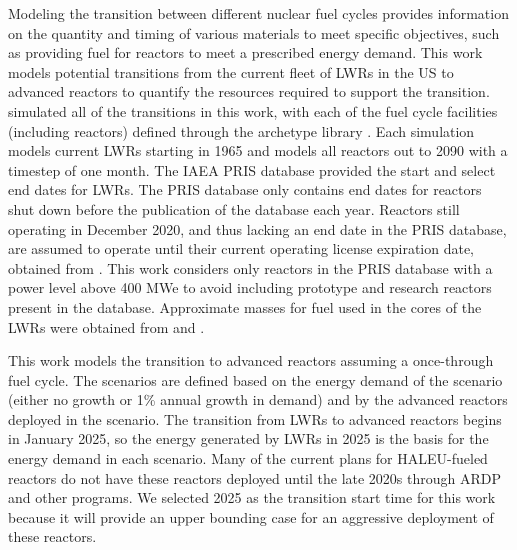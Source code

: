 Modeling the transition between different nuclear fuel cycles provides 
information on the quantity and timing of various materials to meet 
specific objectives, such as providing fuel for reactors to meet a 
prescribed energy demand. 
This work models potential transitions from the 
current fleet of \glspl{LWR} in the US to advanced reactors to quantify the 
resources required to support the transition.
\Cyclus \cite{huff_fundamental_2016} simulated all of the transitions in this 
work, with each of the fuel cycle facilities (including reactors) defined 
through the \Cycamore archetype library \cite{carlsen_cycamore_2014}. Each 
simulation models current 
\glspl{LWR} starting in 1965 and models all reactors out to 2090 with a timestep 
of one month. The \gls{IAEA} \gls{PRIS} database \cite{noauthor_power_1989} 
provided the start and select end dates for \glspl{LWR}. The \gls{PRIS} database 
only contains end dates for reactors shut down before the publication of the 
database each year. Reactors still operating in December 2020, and thus 
lacking an end date in the \gls{PRIS} database, are assumed to operate until 
their current operating license expiration date, obtained from 
\cite{nei_us_2021}. This work considers only 
reactors in the \gls{PRIS} database with a power level above 400 MWe 
to avoid including prototype and research reactors present in the database. 
Approximate masses for fuel used in the cores of the \glspl{LWR} were obtained 
from \cite{todreas_nuclear_2012} and \cite{cacuci_handbook_2010}. 

This work models the transition to advanced reactors assuming a 
once-through fuel cycle. The scenarios are defined based 
on the energy demand 
of the scenario (either no growth or 1\% annual growth in demand) and by the 
advanced reactors deployed in the scenario. The transition from \glspl{LWR} 
to advanced reactors begins in January 2025, so the energy generated by 
\glspl{LWR} in 2025 is the basis for the energy demand in each scenario.  
Many of the 
current plans for \gls{HALEU}-fueled reactors do not have these reactors 
deployed until the late 2020s \cite{nichol_current_2021} through \gls{ARDP} 
and other programs. We selected 2025 as the transition 
start time for this work because it will provide an upper bounding case for 
an aggressive deployment of these reactors. 

